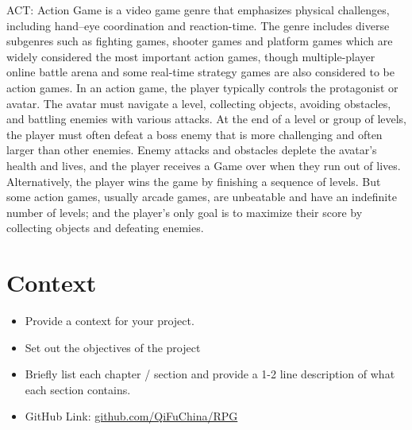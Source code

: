 ACT: Action Game is a video game genre that emphasizes physical challenges, including hand–eye coordination and reaction-time. The genre includes diverse subgenres such as fighting games, shooter games and platform games which are widely considered the most important action games, though multiple-player online battle arena and some real-time strategy games are also considered to be action games. In an action game, the player typically controls the protagonist or avatar. The avatar must navigate a level, collecting objects, avoiding obstacles, and battling enemies with various attacks. At the end of a level or group of levels, the player must often defeat a boss enemy that is more challenging and often larger than other enemies. Enemy attacks and obstacles deplete the avatar's health and lives, and the player receives a Game over when they run out of lives. Alternatively, the player wins the game by finishing a sequence of levels. But some action games, usually arcade games, are unbeatable and have an indefinite number of levels; and the player's only goal is to maximize their score by collecting objects and defeating enemies.

\chapter{Context}
\begin{itemize}
\item Provide a context for your project.
\item Set out the objectives of the project
\item Briefly list each chapter / section and provide a 1-2 line description of what each section contains.
\item GitHub Link: \href{https://github.com/QiFuChina/RPG}{github.com/QiFuChina/RPG}
\end{itemize}

